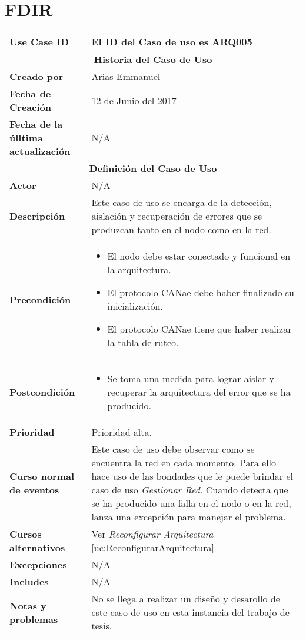 
\section{FDIR}\label{uc:FDIR}

\begin{longtable}{|p{5cm}|p{8cm}|}
  \hline
  \textbf{Use Case ID} & El ID del Caso de uso es ARQ005 \\ \hline
  \multicolumn{2}{|c|}{\Large\textbf{Historia del Caso de Uso}} \\ \hline
  \textbf{Creado por} & Arias Emmanuel \\ \hline
  \textbf{Fecha de Creación} & 12 de Junio del 2017 \\ \hline
  \textbf{Fecha de la úlltima actualización} & N/A \\ \hline
  \multicolumn{2}{|c|}{\Large\textbf{Definición del Caso de Uso}} \\ \hline
  \textbf{Actor} & N/A \\ \hline
  \textbf{Descripción} & Este caso de uso se encarga de la detección, aislación
y recuperación de errores que se produzcan tanto en el nodo
como en la red. \\ \hline
  \textbf{Precondición} & \begin{itemize}
\item El nodo debe estar conectado y funcional en la arquitectura.
\item El protocolo CANae debe haber finalizado su inicialización.
\item El protocolo CANae tiene que haber realizar la tabla de ruteo.
\end{itemize} \\ \hline
  \textbf{Postcondición}  & \begin{itemize}
\item Se toma una medida para lograr aislar y recuperar la arquitectura
  del error que se ha producido.
\end{itemize} \\ \hline
  \textbf{Prioridad} & Prioridad alta. \\ \hline
  \textbf{Curso normal de eventos} & Este caso de uso debe observar como se encuentra la red en cada momento. Para
ello hace uso de las bondades que le puede brindar el caso de uso \textit{
  Gestionar Red}. Cuando detecta que se ha producido una falla en el nodo o en la red,
lanza una excepción para manejar el problema. 
 \\ \hline
\textbf{Cursos alternativos} & Ver \textit{Reconfigurar Arquitectura} \ref{uc:ReconfigurarArquitectura} \\ \hline
\textbf{Excepciones} & N/A \\ \hline
\textbf{Includes} & N/A \\ \hline
\textbf{Notas y problemas} & No se llega a realizar un diseño y desarollo de este caso de uso
en esta instancia del trabajo de tesis. \\ \hline
\end{longtable}


